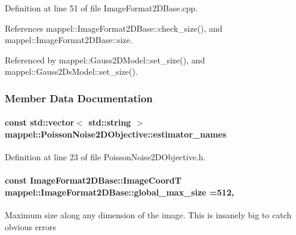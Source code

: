Definition at line 51 of file Image\+Format2\+D\+Base.\+cpp.



References mappel\+::\+Image\+Format2\+D\+Base\+::check\+\_\+size(), and mappel\+::\+Image\+Format2\+D\+Base\+::size.



Referenced by mappel\+::\+Gauss2\+D\+Model\+::set\+\_\+size(), and mappel\+::\+Gauss2\+Ds\+Model\+::set\+\_\+size().



\subsubsection{Member Data Documentation}
\paragraph[{\texorpdfstring{estimator\+\_\+names}{estimator_names}}]{\setlength{\rightskip}{0pt plus 5cm}const std\+::vector$<$ std\+::string $>$ mappel\+::\+Poisson\+Noise2\+D\+Objective\+::estimator\+\_\+names\hspace{0.3cm}{\ttfamily [static]}}\hypertarget{classmappel_1_1PoissonNoise2DObjective_ac661699516dcee8b4e8a440e9b8b62d1}{}\label{classmappel_1_1PoissonNoise2DObjective_ac661699516dcee8b4e8a440e9b8b62d1}


Definition at line 23 of file Poisson\+Noise2\+D\+Objective.\+h.

\paragraph[{\texorpdfstring{global\+\_\+max\+\_\+size}{global_max_size}}]{\setlength{\rightskip}{0pt plus 5cm}const {\bf Image\+Format2\+D\+Base\+::\+Image\+CoordT} mappel\+::\+Image\+Format2\+D\+Base\+::global\+\_\+max\+\_\+size =512\hspace{0.3cm}{\ttfamily [static]}, {\ttfamily [inherited]}}\hypertarget{classmappel_1_1ImageFormat2DBase_a11c9bb87930f597dff17e9923b73bf5e}{}\label{classmappel_1_1ImageFormat2DBase_a11c9bb87930f597dff17e9923b73bf5e}
Maximum size along any dimension of the image. This is insanely big to catch obvious errors 

